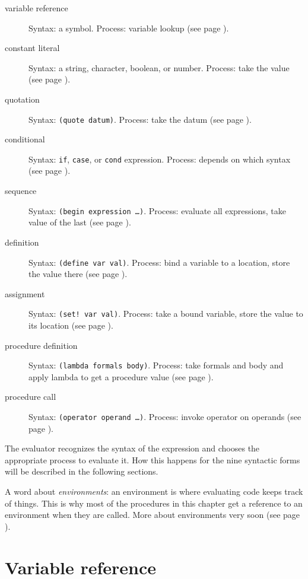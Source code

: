 \documentclass[a5paper,draft]{memoir}
\begin{document}
\begin{description}
\item[variable reference] Syntax: a symbol. Process: variable lookup (see page \pageref{variable-reference}).
\item[constant literal] Syntax: a string, character, boolean, or number. Process: take the value (see page \pageref{constant-literal}).
\item[quotation] Syntax: \texttt{(quote datum)}. Process: take the datum (see page \pageref{quotation}).
\item[conditional] Syntax: \texttt{if}, \texttt{case}, or \texttt{cond} expression. Process: depends on which syntax (see page \pageref{conditional}).
\item[sequence] Syntax: \texttt{(begin expression \ldots )}. Process: evaluate all expressions, take value of the last (see page \pageref{sequence}).
\item[definition] Syntax: \texttt{(define var val)}. Process: bind a variable to a location, store the value there (see page \pageref{definition}).
\item[assignment] Syntax: \texttt{(set! var val)}. Process: take a bound variable, store the value to its location (see page \pageref{assignment}).
\item[procedure definition] Syntax: \texttt{(lambda formals body)}. Process: take formals and body and apply lambda to get a procedure value (see page \pageref{procedure-definition}).
\item[procedure call] Syntax: \texttt{(operator operand \ldots )}. Process: invoke operator on operands (see page \pageref{procedure-call}).
\end{description}

The evaluator recognizes the syntax of the expression and chooses the appropriate process to evaluate it. How this happens for the nine syntactic forms will be described in the following sections.

A word about \emph{environments}: an environment is where evaluating code keeps track of things. This is why most of the procedures in this chapter get a reference to an environment when they are called. More about environments very soon (see page \pageref{environments}).

\section{Variable reference}
\label{variable-reference}
\end{document}
